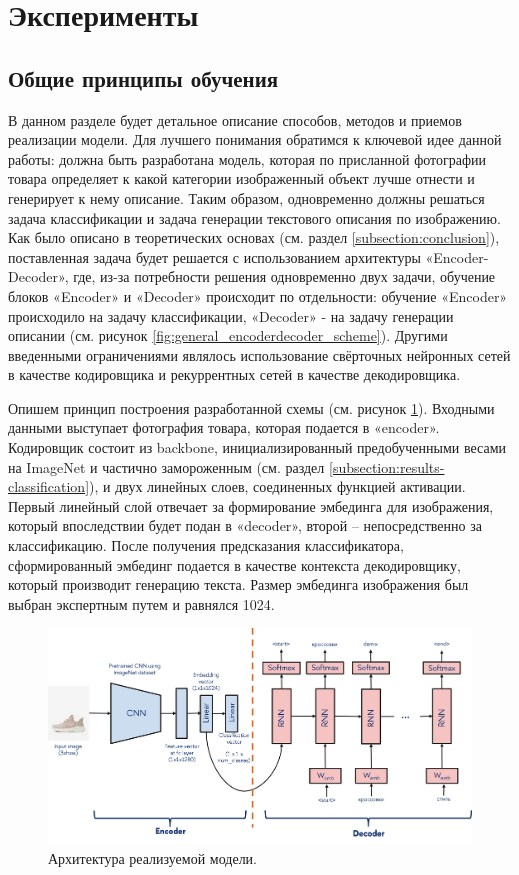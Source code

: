 \documentclass[a4paper,12pt]{extarticle}
\begin{document}
\newpage
\section{Эксперименты}

\subsection{Общие принципы обучения}

В данном разделе будет детальное описание способов, методов и приемов реализации модели. Для лучшего понимания обратимся к ключевой идее данной работы: должна быть разработана модель, которая по присланной фотографии товара определяет к какой категории изображенный объект лучше отнести и генерирует к нему описание. Таким образом, одновременно должны решаться задача классификации и задача генерации текстового описания по изображению. Как было описано в теоретических основах (см. раздел \ref{subsection:conclusion}), поставленная задача будет решается с использованием архитектуры «Encoder-Decoder», где, из-за потребности решения одновременно двух задачи, обучение блоков «Encoder» и «Decoder» происходит по отдельности: обучение «Encoder» происходило на задачу классификации, «Decoder» - на задачу генерации описании (см. рисунок \ref{fig:general_encoderdecoder_scheme}). Другими введенными ограничениями являлось использование свёрточных нейронных сетей в качестве кодировщика и рекуррентных сетей в качестве декодировщика.

Опишем принцип построения разработанной схемы (см. рисунок \ref{fig:general_scheme}). Входными данными выступает фотография товара, которая подается в «encoder». Кодировщик состоит из backbone, инициализированный предобученными весами на ImageNet и частично замороженным (см. раздел \ref{subsection:results-classification}), и двух линейных слоев, соединенных функцией активации. Первый линейный слой отвечает за формирование эмбединга для изображения, который впоследствии будет подан в «decoder», второй – непосредственно за классификацию. После получения предсказания классификатора, сформированный эмбединг подается в качестве контекста декодировщику, который производит генерацию текста. Размер эмбединга изображения был выбран экспертным путем и равнялся 1024.

\begin{figure}[ht]
	\centering
	\includegraphics[scale=0.55]{general_scheme.png}
	\caption{Архитектура реализуемой модели.}
	\label{fig:general_scheme}
\end{figure}
\end{document}

